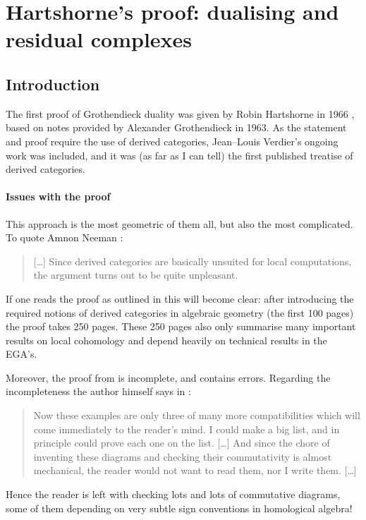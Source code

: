 \documentclass[10pt,a4paper]{article}
\begin{document}
\section{Hartshorne's proof: dualising and residual complexes}
\label{section:hartshorne}
\subsection{Introduction}
\label{subsection:context}
The first proof of Grothendieck duality was given by Robin Hartshorne in 1966 \cite{hartshorne-residues-and-duality}, based on notes provided by Alexander Grothendieck in 1963. As the statement and proof require the use of derived categories, Jean--Louis Verdier's ongoing work was included, and it was (as far as I can tell) the first published treatise of derived categories.

\paragraph{Issues with the proof}
This approach is the most geometric of them all, but also the most complicated. To quote Amnon Neeman \cite{neeman-grothendieck-duality-bousfield-brown}:
\begin{quote}
  [\ldots] Since derived categories are basically unsuited for local computations, the argument turns out to be quite unpleasant.
\end{quote}
If one reads the proof as outlined in \cite{hartshorne-residues-and-duality} this will become clear: after introducing the required notions of derived categories in algebraic geometry (the first 100 pages) the proof takes 250 pages. These 250 pages also only summarise many important results on local cohomology and depend heavily on technical results in the EGA's.

Moreover, the proof from \cite{hartshorne-residues-and-duality} is incomplete, and contains errors. Regarding the incompleteness the author himself says in \cite[\S II.5]{hartshorne-residues-and-duality}:
\begin{quote}
  Now these examples are only three of many more compatibilities which will come immediately to the reader's mind. I could make a big list, and in principle could prove each one on the list. [\ldots] And since the chore of inventing these diagrams and checking their commutativity is almost mechanical, the reader would not want to read them, nor I write them. [\ldots]
\end{quote}
Hence the reader is left with checking lots and lots of commutative diagrams, some of them depending on very subtle sign conventions in homological algebra!
\end{document}
